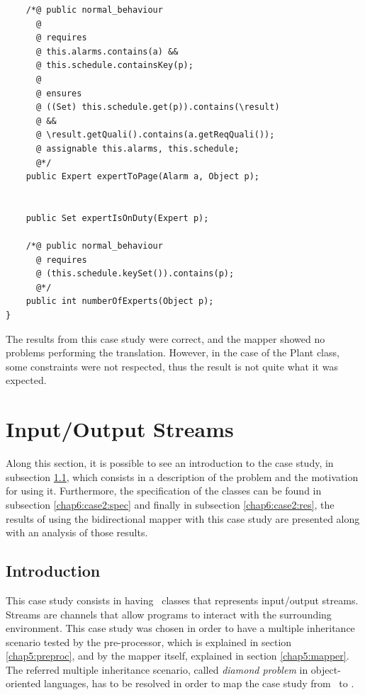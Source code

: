 \begin{description}
\begin{lstlisting}
	/*@ public normal_behaviour
	  @
	  @ requires
	  @ this.alarms.contains(a) && 
	  @ this.schedule.containsKey(p);
	  @
	  @ ensures
	  @ ((Set) this.schedule.get(p)).contains(\result)
	  @ && 
	  @ \result.getQuali().contains(a.getReqQuali());
	  @ assignable this.alarms, this.schedule;
	  @*/
	public Expert expertToPage(Alarm a, Object p);
	

	public Set expertIsOnDuty(Expert p);

	/*@ public normal_behaviour
	  @ requires
	  @ (this.schedule.keySet()).contains(p);
	  @*/	
	public int numberOfExperts(Object p);
}
\end{lstlisting}
\end{description}

\lstset{language=VDM++}
\lstset{style=mystyle}

The results from this case study were correct, and the mapper showed no problems performing the translation. However, in the case of the Plant class, some constraints were not respected, thus the result is not quite what it was expected.

\section{Input/Output Streams}
\label{chap6:stream}

Along this section, it is possible to see an introduction to the case study, in subsection \ref{chap6:case2:intro}, which consists in a description of the problem and the motivation for using it. Furthermore, the specification of the classes can be found in subsection \ref{chap6:case2:spec} and finally in subsection \ref{chap6:case2:res}, the results of using the  bidirectional mapper with this case study are presented along with an analysis of those results.


\subsection{Introduction}
\label{chap6:case2:intro}

This case study consists in having \vpp\ classes that represents input/output streams. Streams are channels that allow programs to interact with the surrounding environment. This case study was chosen in order to have a multiple inheritance scenario tested by the pre-processor, which is explained in section \ref{chap5:preproc}, and by the mapper itself, explained in section \ref{chap5:mapper}. The referred multiple inheritance scenario, called \textit{diamond problem} in object-oriented languages, has to be resolved in order to map the case study from \vpp\ to \jml. 

